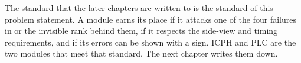 The standard that the later chapters are written to is the standard of this problem statement. A module earns its place if it attacks one of the four failures in  or the invisible rank behind them, if it respects the side-view and timing requirements, and if its errors can be shown with a sign. ICPH and PLC are the two modules that meet that standard. The next chapter writes them down.
